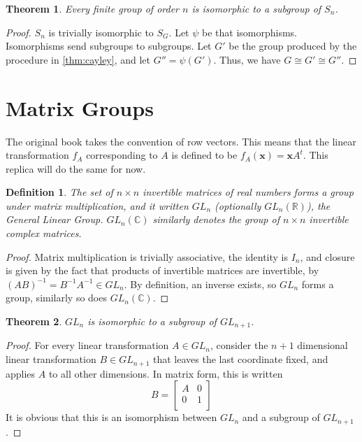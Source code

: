 \documentclass{article}
\newtheorem{theorem}{Theorem}[section]
\newtheorem{definition}{Definition}[section]
\begin{document}
\begin{theorem}
    Every finite group of order $n$ is isomorphic to a subgroup of $S_n$.
\end{theorem}
\begin{proof}
    $S_n$ is trivially isomorphic to $S_G$. Let $\psi$ be that isomorphisms. Isomorphisms send subgroups to subgroups.
    Let $G'$ be the group produced by the procedure in \autoref{thm:cayley},
    and let $G'' = \psi(G')$. Thus, we have $G \cong G' \cong G''$.
\end{proof}

\section{Matrix Groups}

The original book takes the convention of row vectors. 
This means that the linear transformation $f_A$ corresponding to $A$
is defined to be $f_A(\mathbf{x}) = \mathbf{x}A^{t}$.
This replica will do the same for now.

\begin{definition}
    The set of $n \times n$ invertible matrices of real numbers forms a group under matrix multiplication,
    and it written $GL_n$ (optionally $GL_n(\mathbb{R})$), the \emph{General Linear Group}.
    $GL_n(\mathbb{C})$ similarly denotes the group of $n \times n$ invertible complex matrices.
\end{definition}
\begin{proof}
    Matrix multiplication is trivially associative, the identity is $I_n$, 
    and closure is given by the fact that 
    products of invertible matrices are invertible, by $(AB)^{-1} = B^{-1}A^{-1} \in GL_n$.
    By definition, an inverse exists, so $GL_n$ forms a group, similarly so does $GL_n(\mathbb{C})$.
\end{proof}

\begin{theorem}
    $GL_n$ is isomorphic to a subgroup of $GL_{n+1}$.
\end{theorem}
\begin{proof}
    For every linear transformation $A \in GL_n$,
    consider the $n+1$ dimensional linear transformation $B \in GL_{n+1}$ that leaves the last coordinate fixed,
    and applies $A$ to all other dimensions. In matrix form, this is written
    \[B = \begin{bmatrix}
        A & 0 \\
        0 & 1 \\
    \end{bmatrix}\]
    It is obvious that this is an isomorphism between $GL_n$ and a subgroup of $GL_{n+1}$.
\end{proof}
\end{document}
